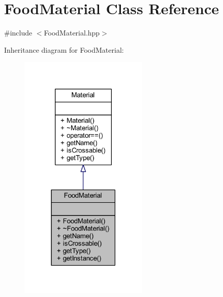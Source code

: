 \hypertarget{class_food_material}{}\section{Food\+Material Class Reference}
\label{class_food_material}


{\ttfamily \#include $<$Food\+Material.\+hpp$>$}



Inheritance diagram for Food\+Material\+:\nopagebreak
\begin{figure}[H]
\begin{center}
\leavevmode
\includegraphics[width=174pt]{class_food_material__inherit__graph}
\end{center}
\end{figure}


